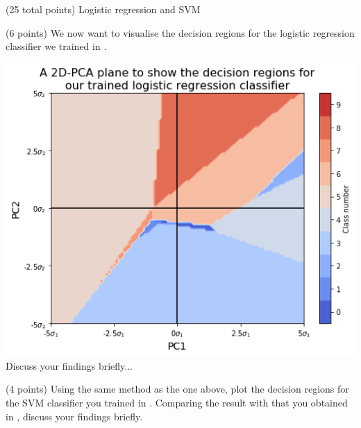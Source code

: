 \documentclass[12pt]{article}
\begin{document}
\begin{question}{(25 total points) Logistic regression and SVM}
\begin{subquestion}{(6 points)
       We now want to visualise the decision regions for the logistic
       regression classifier we trained in .
     }
   

      \begin{answerbox}{50em}
         \includegraphics[width=1\textwidth]{images/q23.png}
        Discuss your findings briefly...
      \end{answerbox}
  


   \end{subquestion}
   \begin{subquestion}{(4 points)
       Using the same method as the one above, plot the decision regions for
       the SVM classifier you trained in .
       Comparing the result with that you obtained in , discuss your
       findings briefly.
     } \label{Q2.4}
   


\end{subquestion}
\end{question}
\end{document}
